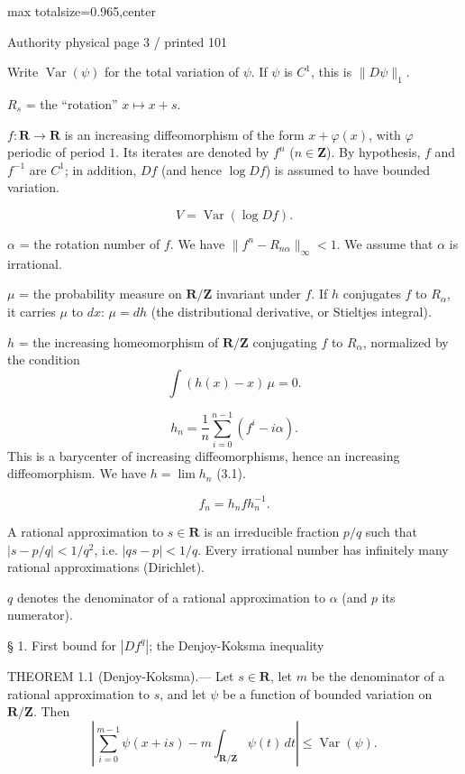 \documentclass{article}
\begin{document}
\newpage
\noindent\begin{adjustbox}{max totalsize={\textwidth}{0.965\textheight},center}\begin{minipage}{\textwidth}
\noindent\hfill\scriptsize Authority physical page 3 / printed 101\par\normalsize
Write \(\operatorname{Var}(\psi)\) for the total variation of \(\psi\). If \(\psi\) is \(C^1\), this is \(\|D\psi\|_1\).

\(R_s\) = the “rotation” \(x\longmapsto x+s\).

\(f:\mathbf R\to\mathbf R\) is an increasing diffeomorphism of the form \(x+\varphi(x)\), with \(\varphi\) periodic of period \(1\). Its iterates are denoted by \(f^n\) (\(n\in\mathbf Z\)). By hypothesis, \(f\) and \(f^{-1}\) are \(C^1\); in addition, \(Df\) (and hence \(\log Df\)) is assumed to have bounded variation.

\[
V=\operatorname{Var}(\log Df).
\]

\(\alpha\) = the rotation number of \(f\). We have \(\|f^n-R_{n\alpha}\|_\infty<1\). We assume that \(\alpha\) is irrational.

\(\mu\) = the probability measure on \(\mathbf R/\mathbf Z\) invariant under \(f\). If \(h\) conjugates \(f\) to \(R_\alpha\), it carries \(\mu\) to \(dx\): \(\mu=dh\) (the distributional derivative, or Stieltjes integral).

\(h\) = the increasing homeomorphism of \(\mathbf R/\mathbf Z\) conjugating \(f\) to \(R_\alpha\), normalized by the condition
\[
\int(h(x)-x)\,\mu=0.
\]

\[
h_n=\frac1n\sum_{i=0}^{n-1}(f^i-i\alpha).
\]
This is a barycenter of increasing diffeomorphisms, hence an increasing diffeomorphism. We have \(h=\lim h_n\) (3.1).

\[
f_n=h_nfh_n^{-1}.
\]

A rational approximation to \(s\in\mathbf R\) is an irreducible fraction \(p/q\) such that \(|s-p/q|<1/q^2\), i.e. \(|qs-p|<1/q\). Every irrational number has infinitely many rational approximations (Dirichlet).

\(q\) denotes the denominator of a rational approximation to \(\alpha\) (and \(p\) its numerator).

§ 1. First bound for \(|Df^q|\); the Denjoy-Koksma inequality

THEOREM 1.1 (Denjoy-Koksma).— Let \(s\in\mathbf R\), let \(m\) be the denominator of a rational approximation to \(s\), and let \(\psi\) be a function of bounded variation on \(\mathbf R/\mathbf Z\). Then
\[
\left|\sum_{i=0}^{m-1}\psi(x+is)-m\int_{\mathbf R/\mathbf Z}\psi(t)\,dt\right|\leq\operatorname{Var}(\psi).
\]
\end{minipage}\end{adjustbox}
\end{document}
